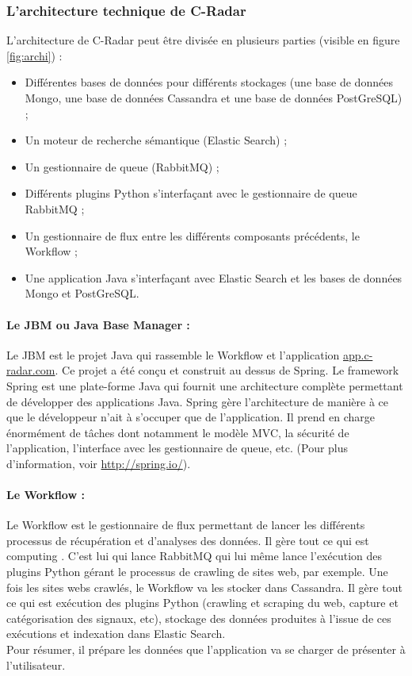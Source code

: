         \subsubsection{L'architecture technique de C-Radar}
        \label{subsub:archi_tech}
            L'architecture de C-Radar peut être divisée en plusieurs parties (visible en figure \ref{fig:archi}) :
            \begin{itemize}
                \item Différentes bases de données pour différents stockages (une base de données Mongo, une base de données Cassandra et une base de données PostGreSQL) ;
                \item Un moteur de recherche sémantique (Elastic Search) ;
                \item Un gestionnaire de queue (RabbitMQ) ;
                \item Différents plugins Python s'interfaçant avec le gestionnaire de queue RabbitMQ ;
                \item Un gestionnaire de flux entre les différents composants précédents, le Workflow ;
                \item Une application Java s'interfaçant avec Elastic Search et les bases de données Mongo et PostGreSQL.
            \end{itemize}

            \paragraph{Le JBM ou Java Base Manager :}
                Le JBM est le projet Java qui rassemble le Workflow et l'application \href{app.c-radar.com}{app.c-radar.com}. Ce projet a été conçu et construit au dessus de Spring. Le framework Spring est une plate-forme Java qui fournit une architecture complète permettant de développer des applications Java. Spring gère l'architecture de manière à ce que le développeur n'ait à s'occuper que de l'application. Il prend en charge énormément de tâches dont notamment le modèle MVC, la sécurité de l'application, l'interface avec les gestionnaire de queue, etc. (Pour plus d'information, voir \href{http://spring.io/}{http://spring.io/}).

            \paragraph{Le Workflow :}
                Le Workflow est le gestionnaire de flux permettant de lancer les différents processus de récupération et d'analyses des données. Il gère tout ce qui est \og computing \fg. C'est lui qui lance RabbitMQ qui lui même lance l'exécution des plugins Python gérant le processus de crawling de sites web, par exemple. Une fois les sites webs crawlés, le Workflow va les stocker dans Cassandra. Il gère tout ce qui est exécution des plugins Python (crawling et scraping du web, capture et catégorisation des signaux, etc), stockage des données produites à l'issue de ces exécutions et indexation dans Elastic Search.\\
                Pour résumer, il prépare les données que l'application va se charger de présenter à l'utilisateur.

